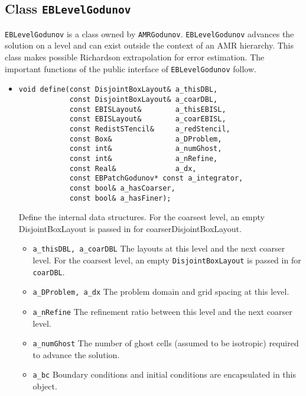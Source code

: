 \subsection{Class {\tt EBLevelGodunov} }
{\tt EBLevelGodunov} is  a class owned by {\tt AMRGodunov}.
{\tt EBLevelGodunov} advances the solution on a level
and can exist outside the context of an AMR hierarchy.
This class makes possible Richardson extrapolation 
for error estimation.  The important functions of
the public interface of {\tt EBLevelGodunov} follow.
\begin{itemize}
\item \begin{small} \begin{verbatim}
void define(const DisjointBoxLayout& a_thisDBL,
            const DisjointBoxLayout& a_coarDBL,
            const EBISLayout&        a_thisEBISL,    
            const EBISLayout&        a_coarEBISL,
            const RedistSTencil&     a_redStencil,
            const Box&               a_DProblem,
            const int&               a_numGhost,
            const int&               a_nRefine,
            const Real&              a_dx,
            const EBPatchGodunov* const a_integrator,
            const bool& a_hasCoarser,
            const bool& a_hasFiner);
\end{verbatim}\end{small}
     Define the internal data structures.
     For the coarsest level, an empty DisjointBoxLayout
     is passed in for coarserDisjointBoxLayout.
\begin{itemize}    
\item \verb/a_thisDBL, a_coarDBL/
The layouts at this level and the next coarser level.  
     For the coarsest level, an empty {\tt DisjointBoxLayout}
     is passed in for \verb/coarDBL/.
\item \verb/a_DProblem, a_dx/ The problem domain and grid 
        spacing at this level.
\item \verb/a_nRefine/ The refinement ratio between
     this level and the next coarser level.
\item \verb/a_numGhost/ The number of ghost cells (assumed
        to be isotropic) required to advance the solution.
\item \verb/a_bc/  Boundary conditions and initial conditions
        are encapsulated in this object.
\end{itemize}      


\end{itemize}
